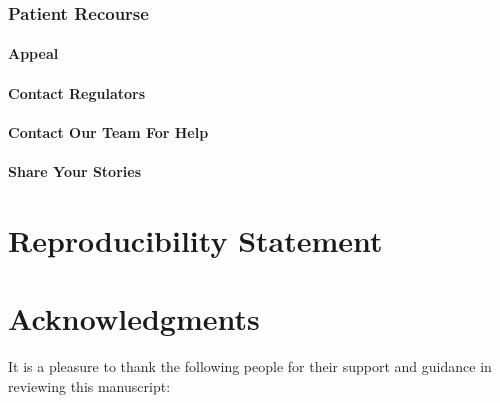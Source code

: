 \documentclass[12pt, a4paper,twoside]{report}
\theoremstyle{plain} %
\theoremstyle{definition} %
\theoremstyle{remark} %
\numberwithin{equation}{chapter}
\begin{document}
		\subsection{Patient Recourse}
		
		\subsubsection{Appeal}
		
		\subsubsection{Contact Regulators}
		
		\subsubsection{Contact Our Team For Help}
		
		\subsubsection{Share Your Stories}
		
		\chapter{Reproducibility Statement}\label{reproducibilitystatement}
		
		
		\chapter{Acknowledgments}
		It is a pleasure to thank the following people for their support and guidance in reviewing this manuscript:
		
		
		
		
		
		
		
	
\end{document}

